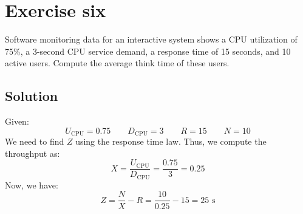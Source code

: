\section{Exercise six}

Software monitoring data for an interactive system shows a CPU utilization of 75\%, a 3-second CPU service demand, a response time of 15 seconds, and 10 active users. 
Compute the average think time of these users.

\subsection*{Solution}
Given:
\[U_{\text{CPU}}=0.75\qquad D_{\text{CPU}}=3\qquad R=15\qquad N=10\]
We need to find $Z$ using the response time law. 
Thus, we compute the throughput as:
\[X=\dfrac{U_{\text{CPU}}}{D_{\text{CPU}}}=\dfrac{0.75}{3}=0.25\]
Now, we have:
\[Z=\dfrac{N}{X}-R=\dfrac{10}{0.25}-15=25\text{ s}\]